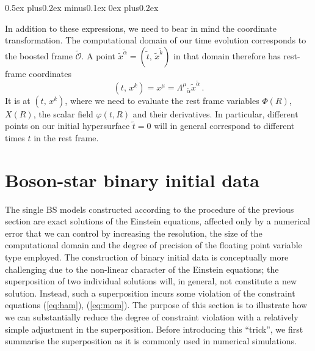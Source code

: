 \documentclass[11pt]{report}  %
\begin{document}
\begin{list}{\rm{\bf ()}}{
                
             \parsep0.5ex plus0.2ex minus0.1ex \itemsep0ex plus0.2ex}
  \item In addition to these expressions, we need to bear in mind the coordinate
  transformation. The computational domain of our time evolution corresponds
  to the boosted frame $\tilde{\mathcal{O}}$. A
  point $\tilde{x}^{\tilde{\alpha}}=(\tilde{t},\,\tilde{x}^{\tilde{k}})$
  in that domain therefore has rest-frame coordinates
  \begin{equation}
     (t,\,x^k) = x^{\mu} = \Lambda^{\mu}{}_{\tilde{\alpha}}\tilde{x}^{\tilde{\alpha}}\,.
  \end{equation}
  It is at $(t,\,x^k)$, where we need to evaluate the rest frame variables
  $\Phi(R)$, $X(R)$, the scalar field $\varphi(t,R)$ and their
  derivatives. In particular, different points on our initial
  hypersurface $\tilde{t}=0$ will in general correspond to different
  times $t$ in the rest frame.
\end{list}
%

\section{Boson-star binary initial data}
\label{sec:superposition}
%
The single BS models constructed according to the procedure of the
previous section are exact solutions of the Einstein equations, affected
only by a numerical error that we can control by increasing the resolution,
the size of the computational domain and the degree of precision of the floating
point variable type employed. The construction of binary initial data is
conceptually more challenging due to the non-linear character of the
Einstein equations; the superposition of two individual solutions will,
in general, not constitute a new solution. Instead, such a superposition
incurs some violation of the constraint equations (\ref{eq:ham}),
(\ref{eq:mom}). The purpose of this section is to illustrate
how we can substantially reduce the degree of constraint
violation with a relatively simple adjustment in the
superposition. Before introducing this ``trick'', we first
summarise the superposition as it is commonly used in numerical
simulations.

\end{document}
